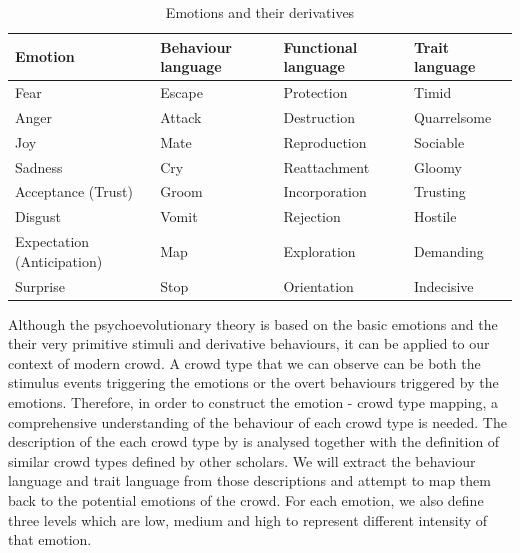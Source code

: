 \begin{table}
\caption{Emotions and their derivatives}
\label{table:derivationOfEmotion}
\begin{tabular}{|p{5cm}|p{3cm}|p{3cm}|p{3cm}|}
\hline
\textbf{Emotion} & \textbf{Behaviour language} & \textbf{Functional language} & \textbf{Trait language} \\
\hline
Fear & Escape & Protection & Timid \\
\hline
Anger & Attack & Destruction & Quarrelsome \\
\hline
Joy & Mate & Reproduction & Sociable \\
\hline
Sadness & Cry & Reattachment & Gloomy \\
\hline
Acceptance (Trust) & Groom & Incorporation & Trusting \\
\hline
Disgust & Vomit & Rejection & Hostile \\
\hline
Expectation (Anticipation) & Map & Exploration & Demanding \\
\hline
Surprise & Stop & Orientation & Indecisive \\
\hline
\end{tabular}
\end{table}

Although the psychoevolutionary theory is based on the basic emotions and the their very primitive stimuli and derivative behaviours, it can be applied to our context of modern crowd. A crowd type that we can observe can be both the stimulus events triggering the emotions or the overt behaviours triggered by the emotions. Therefore, in order to construct the emotion - crowd type mapping, a comprehensive understanding of the behaviour of each crowd type is needed. The description of the each crowd type by \citet{Berlonghi1995} is analysed together with the definition of similar crowd types defined by other scholars. We will extract the behaviour language and trait language from those descriptions and attempt to map them back to the potential emotions of the crowd. For each emotion, we also define three levels which are low, medium and high to represent different intensity of that emotion. 

